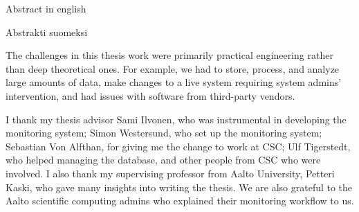 \makecoverpage
\makecopyrightpage

\begin{abstractpage}[english]
Abstract in english
\end{abstractpage}

\begin{abstractpage}[finnish]
Abstrakti suomeksi
\end{abstractpage}

The challenges in this thesis work were primarily practical engineering rather than deep theoretical ones.
For example, we had to store, process, and analyze large amounts of data, make changes to a live system requiring system admins' intervention, and had issues with software from third-party vendors.

I thank my thesis advisor Sami Ilvonen, who was instrumental in developing the monitoring system; Simon Westersund, who set up the monitoring system; Sebastian Von Alfthan, for giving me the change to work at CSC; Ulf Tigerstedt, who helped managing the database, and other people from CSC who were involved.
I also thank my supervising professor from Aalto University, Petteri Kaski, who gave many insights into writing the thesis.
We are also grateful to the Aalto scientific computing admins who explained their monitoring workflow to us.

\newpage

\setcounter{tocdepth}{2}
\thesistableofcontents
